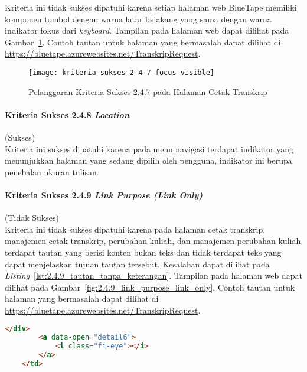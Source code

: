 Kriteria ini tidak sukses dipatuhi karena setiap halaman web BlueTape memiliki komponen tombol dengan warna latar belakang yang sama dengan warna indikator fokus dari \textit{keyboard}. Tampilan pada halaman web dapat dilihat pada \mbox{Gambar \ref{fig:2.4.7_focus_visible}}. Contoh tautan untuk halaman yang bermasalah dapat dilihat di \url{https://bluetape.azurewebsites.net/TranskripRequest}. 

\begin{figure}[H]
    \centering  
    \texttt{[image: kriteria-sukses-2-4-7-focus-visible]}  
    \caption[Pelanggaran Kriteria Sukses 2.4.7 pada Halaman Cetak Transkrip]{Pelanggaran Kriteria Sukses 2.4.7 pada Halaman Cetak Transkrip}
    \label{fig:2.4.7_focus_visible}  
\end{figure}

\paragraph{Kriteria Sukses 2.4.8 \textit{Location}}
\label{par:kepatuhan_bluetape_kriteria_sukses_2.4.8}
(Sukses)\\

Kriteria ini sukses dipatuhi karena pada menu navigasi terdapat indikator yang menunjukkan halaman yang sedang dipilih oleh pengguna, indikator ini berupa penebalan ukuran tulisan.

\paragraph{Kriteria Sukses 2.4.9 \textit{Link Purpose (Link Only)}}
\label{par:kepatuhan_bluetape_kriteria_sukses_2.4.9}
(Tidak Sukses)\\

Kriteria ini tidak sukses dipatuhi karena pada halaman cetak transkrip, manajemen cetak transkrip, perubahan kuliah, dan manajemen perubahan kuliah terdapat tautan yang berisi konten bukan teks dan tidak terdapat teks yang dapat menjelaskan tujuan tautan tersebut. Kesalahan dapat dilihat pada \mbox{\textit{Listing} \ref{lst:2.4.9_tautan_tanpa_keterangan}}. Tampilan pada halaman web dapat dilihat pada \mbox{Gambar \ref{fig:2.4.9_link_purpose_link_only}}. Contoh tautan untuk halaman yang bermasalah dapat dilihat di \url{https://bluetape.azurewebsites.net/TranskripRequest}.

\begin{lstlisting}[frame=single, label={lst:2.4.9_tautan_tanpa_keterangan}, language=HTML, caption=Pelanggaran Kriteria Sukses 2.4.9 pada Halaman Cetak Transkrip]
        </div>
        <a data-open="detail6">
            <i class="fi-eye"></i>
        </a>
    </td>
\end{lstlisting}

